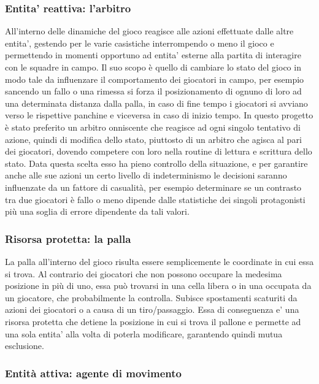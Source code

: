 \subsubsection{Entita' reattiva: l'arbitro}
\label{sec:entita_coinvolte_arbitro}

All’interno delle dinamiche del gioco reagisce alle azioni effettuate dalle altre entita’, gestendo per le varie casistiche interrompendo o meno il gioco e permettendo in momenti opportuno ad entita’ esterne alla partita di interagire con le squadre in campo. Il suo scopo è quello di cambiare lo stato del gioco in modo tale da influenzare il comportamento dei giocatori in campo, per esempio sancendo un fallo o una rimessa si forza il posizionamento di ognuno di loro ad una determinata distanza dalla palla, in caso di fine tempo i giocatori si avviano verso le rispettive panchine e viceversa in caso di inizio tempo. In questo progetto è stato preferito un arbitro onniscente che reagisce ad ogni singolo tentativo di azione, quindi di modifica dello stato, piuttosto di un arbitro che agisca al pari dei giocatori, dovendo competere con loro nella routine di lettura e scrittura dello stato. Data questa scelta esso ha pieno controllo della situazione, e per garantire anche alle sue azioni un certo livello di indeterminismo le decisioni saranno influenzate da un fattore di casualità, per esempio determinare se un contrasto tra due giocatori è fallo o meno dipende dalle statistiche dei singoli protagonisti più una soglia di errore dipendente da tali valori.

\subsubsection{Risorsa protetta: la palla}
\label{sec:entita_coinvolte_palla}

La palla all’interno del gioco risulta essere semplicemente le coordinate in cui essa si trova. Al contrario dei giocatori che non possono occupare la medesima posizione in più di uno, essa può trovarsi in una cella libera o in una occupata da un giocatore, che probabilmente la controlla. Subisce spostamenti scaturiti da azioni dei giocatori o a causa di un tiro/passaggio. Essa di conseguenza e’ una risorsa protetta che detiene la posizione in cui si trova il pallone e permette ad una sola entita’ alla volta di poterla modificare, garantendo quindi mutua esclusione.

\subsubsection{Entità attiva: agente di movimento}
\label{sec:entita_coinvolte_agente}

